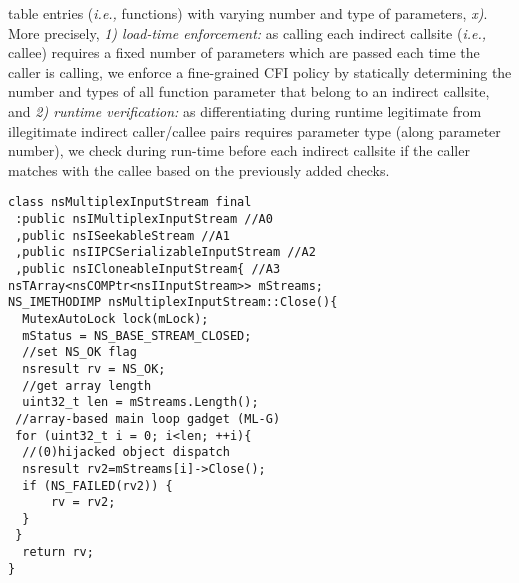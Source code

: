table entries (\textit{i.e.,} functions) with varying number and type of parameters, \textit{x)}. More precisely, 
\textit{1) load-time enforcement:} as calling each indirect callsite (\textit{i.e.,} callee) requires a fixed number of parameters which are passed each time the caller is calling, 
we enforce a fine-grained CFI policy by statically determining the number and types of all function parameter that belong to an indirect callsite, and
\textit{2) runtime verification:} as differentiating during runtime legitimate from illegitimate indirect caller/callee pairs requires parameter type (along parameter number), we 
check during run-time before each indirect callsite if the caller matches with the callee based on the previously added checks.


\newsavebox{\firstlisting}
\begin{lrbox}{\firstlisting}
\begin{minipage}[c]{\linewidth}
\begin{verbatim}
class nsMultiplexInputStream final 
 :public nsIMultiplexInputStream //A0
 ,public nsISeekableStream //A1
 ,public nsIIPCSerializableInputStream //A2
 ,public nsICloneableInputStream{ //A3
nsTArray<nsCOMPtr<nsIInputStream>> mStreams;
NS_IMETHODIMP nsMultiplexInputStream::Close(){
  MutexAutoLock lock(mLock);
  mStatus = NS_BASE_STREAM_CLOSED;
  //set NS_OK flag
  nsresult rv = NS_OK;
  //get array length
  uint32_t len = mStreams.Length();
 //array-based main loop gadget (ML-G)
 for (uint32_t i = 0; i<len; ++i){
  //(0)hijacked object dispatch
  nsresult rv2=mStreams[i]->Close();
  if (NS_FAILED(rv2)) {
      rv = rv2;
  }
 }
  return rv;
}
\end{verbatim}
\end{minipage}
\end{lrbox}

